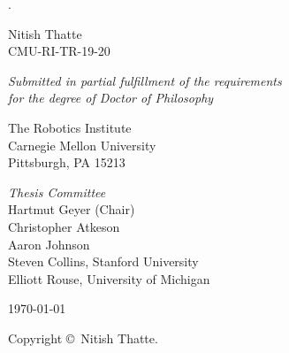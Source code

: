\documentclass[]{tufte-book}
\begin{document}
\frontmatter

\begin{titlepage}
	\begin{fullwidth}
	\centering
    \phantom.
    \vspace{0.5in}
    {\huge{\thesistitle}\par}
    \vspace{0.5in}
    
    Nitish Thatte \\
    CMU-RI-TR-19-20
    \vspace{0.7 in}

   	{\it Submitted in partial fulfillment of the requirements\\ for the degree of Doctor of Philosophy}\\
    \vspace{0.7 in}
    
    The Robotics Institute \\
    Carnegie Mellon University \\
    Pittsburgh, PA 15213
    \vspace{0.7 in}
    

   	{\it Thesis Committee}\\
    Hartmut Geyer (Chair)\\
    Christopher Atkeson\\
    Aaron Johnson\\
    Steven Collins, Stanford University\\
    Elliott Rouse, University of Michigan\\
    \vspace{0.7 in}

    \today \\
    \vspace{0.7 in}
    
    Copyright \copyright \the\year \ Nitish Thatte.
 	\end{fullwidth}
\end{titlepage}





\tableofcontents

\listoffigures

\listoftables

\end{document}
